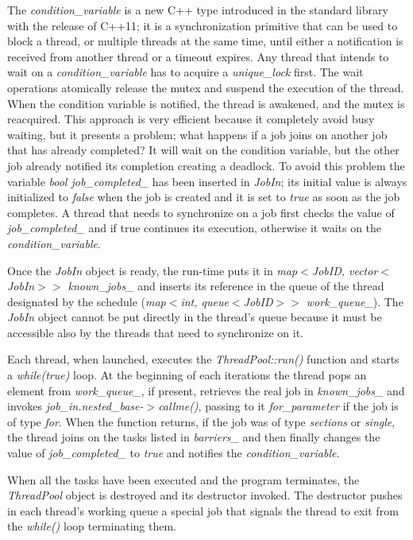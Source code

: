 \documentclass[a4paper,12pt,oneside]{book}
\begin{document}
The \emph{condition\_variable} is a new C++ type introduced in the standard library with the release of C++11; it is a synchronization primitive that can be used to block a thread, or multiple threads at the same time, until either a notification is received from another thread or a timeout expires. Any thread that intends to wait on a \emph{condition\_variable} has to acquire a \emph{unique\_lock} first. The wait operations atomically release the mutex and suspend the execution of the thread. When the condition variable is notified, the thread is awakened, and the mutex is reacquired. This approach is very efficient because it completely avoid busy waiting, but it presents a problem; what happens if a job joins on another job that has already completed? It will wait on the condition variable, but the other job already notified its completion creating a deadlock. To avoid this problem the variable \emph{bool job\_completed\_} has been inserted in \emph{JobIn}; its initial value is always initialized to \emph{false} when the job is created and it is set to \emph{true} as soon as the job completes. A thread that needs to synchronize on a job first checks the value of \emph{job\_completed\_} and if true continues its execution, otherwise it waits on the \emph{condition\_variable}.

Once the \emph{JobIn} object is ready, the run-time puts it in \emph{map$<$JobID, vector$<$JobIn$>>$ known\_jobs\_} and inserts its reference in the queue of the thread designated by the schedule (\emph{map$<$int, queue$<$JobID$>>$ work\_queue\_}). The \emph{JobIn} object cannot be put directly in the thread’s queue because it must be accessible also by the threads that need to synchronize on it. 

Each thread, when launched, executes the \emph{ThreadPool::run()} function and starts a \emph{while(true)} loop. At the beginning of each iterations the thread pops an element from \emph{work\_queue\_}, if present, retrieves the real job in \emph{known\_jobs\_} and invokes \emph{job\_in.nested\_base-$>$callme()}, passing to it \emph{for\_parameter} if the job is of type \emph{for}. When the function returns, if the job was of type \emph{sections} or \emph{single}, the thread joins on the tasks listed in \emph{barriers\_} and then finally changes the value of \emph{job\_completed\_} to \emph{true} and notifies the \emph{condition\_variable}.

When all the tasks have been executed and the program terminates, the \emph{ThreadPool} object is destroyed and its destructor invoked. The destructor pushes in each thread’s working queue a special job that signals the thread to exit from the \emph{while()} loop terminating them.
\end{document}
